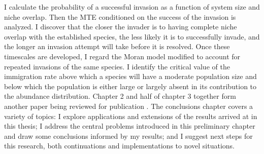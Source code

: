 I calculate the probability of a successful invasion as a function of system size and niche overlap. 
Then the MTE conditioned on the success of the invasion is analyzed. 
I discover that the closer the invader is to having complete niche overlap with the established species, the less likely it is to successfully invade, and the longer an invasion attempt will take before it is resolved. %
Once these timescales are developed, I regard the Moran model modified to account for repeated invasions of the same species. 
I identify the critical value of the immigration rate above which a species will have a moderate population size and below which the population is either large or largely absent in its contribution to the abundance distribution. %
Chapter 2 and half of chapter 3 together form another paper being reviewed for publication \cite{Badali2018}. %
The conclusions chapter covers a variety of topics: I explore applications and extensions of the results arrived at in this thesis; I address the central problems introduced in this preliminary chapter and draw some conclusions informed by my results; and I suggest next steps for this research, both continuations and implementations to novel situations. 
\fi
\iffalse
Big Questions:
How long will a single species exist with only intraspecies interactions?
What mathematical techniques are effective to model such an extinction? 
How long will a species exist with intra and interspecies interactions? That is, how long will two species coexist given some niche overlap? In particular, how does it transition from the effective coexistence of exponential scaling of MTE with carrying capacity to the relatively fast extinction of algebraic scaling as found in the Moran model/limit? 
For an ecosystem with an already established species, what is the probability of success and the timescale of an invasion attempt? How do these probabilities and times depend on niche overlap? 
With repeated immigration of a species, how will that species be distributed in a [neutral] system? In particular, how does the distribution depend on the immigration rate? 
What is the timescale of species transient existence in a neutral model with repeated immigrants? 
Is v=1/gN or gv=1/N the same as a model with v’=gv and g=1? - looks like it should be
\fi



